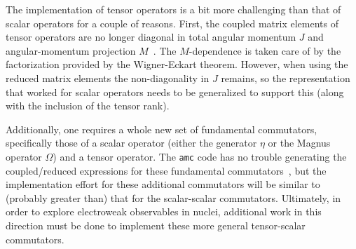 The implementation of tensor operators
is a bit more challenging than that of scalar operators
for a couple of reasons.
First, the coupled matrix elements of tensor operators
are no longer diagonal in total angular momentum $J$
and angular-momentum projection $M$~\cite{Tich20jcoupling}.
The $M$-dependence is taken care of by
the factorization provided by the Wigner-Eckart theorem.
However, when using the reduced matrix elements
the non-diagonality in $J$ remains,
so the representation that worked for scalar operators
needs to be generalized to support this
(along with the inclusion of the tensor rank).

Additionally, one requires a whole new set
of fundamental commutators,
specifically those of a scalar operator
(either the generator $\eta$ or the Magnus operator $\Omega$)
and a tensor operator.
The \texttt{amc} code has no trouble generating
the coupled/reduced expressions for these fundamental commutators~\cite{Tich20jcoupling},
but the implementation effort for these additional commutators
will be similar to (probably greater than) that for the scalar-scalar commutators.
Ultimately,
in order to explore electroweak observables in nuclei,
additional work in this direction must be done
to implement these more general tensor-scalar commutators.
